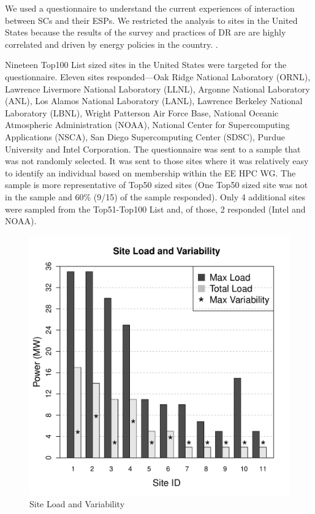 We used a questionnaire to understand the current experiences of interaction between
SCs and their ESPs. We restricted the analysis to sites in the United States
because the results of the survey and practices of DR are are highly
correlated and driven by energy policies in the country. 
\cite{torriti_demand_2010}.

Nineteen Top100 List sized sites in the United States were targeted for the
questionnaire. Eleven sites responded---Oak Ridge National Laboratory (ORNL), 
Lawrence Livermore National Laboratory (LLNL), 
Argonne National Laboratory (ANL), 
Los Alamos National Laboratory (LANL), 
Lawrence Berkeley National Laboratory (LBNL), 
Wright Patterson Air Force Base,
National Oceanic Atmospheric Administration (NOAA), 
National Center for Supercomputing Applications (NSCA), 
San Diego Supercomputing Center (SDSC), 
Purdue University and Intel Corporation. The questionnaire was
sent to a sample that was not randomly selected. It was sent to those sites
where it was relatively easy to identify an individual based on membership
within the EE HPC WG. The sample is more representative of Top50 sized sites
(One Top50 sized site was not in the sample and 60{\%} (9/15) of the sample
responded). Only 4 additional sites were sampled from the Top51-Top100 List
and, of those, 2 responded (Intel and NOAA).
\begin{figure}[htbp]
\begin{center}
\includegraphics[scale=0.45]{NewGraphs/Table1-graph.pdf}
\caption{Site Load and Variability}
\label{figGraph1}
\end{center}
\end{figure}

